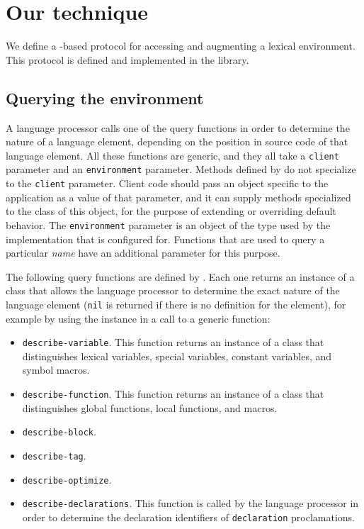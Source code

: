 \section{Our technique}
\label{sec-our-technique}

We define a \clos{}-based protocol for accessing and augmenting a
lexical environment.  This protocol is defined and implemented in the
\trucler{} library.

\subsection{Querying the environment}
\label{querying-the-environment}

A language processor calls one of the query functions in order to
determine the nature of a language element, depending on the position
in source code of that language element.  All these functions are
generic, and they all take a \texttt{client} parameter and an
\texttt{environment} parameter.  Methods defined by \trucler{} do not
specialize to the \texttt{client} parameter.  Client code should pass
an object specific to the application as a value of that parameter,
and it can supply methods specialized to the class of this object, for
the purpose of extending or overriding default behavior.  The
\texttt{environment} parameter is an object of the type used by the
implementation that \trucler{} is configured for.  Functions that are
used to query a particular \emph{name} have an additional parameter
for this purpose.

The following query functions are defined by \trucler{}.  Each one
returns an instance of a class that allows the language processor to
determine the exact nature of the language element (\texttt{nil} is
returned if there is no definition for the element), for example by
using the instance in a call to a generic function:

\begin{itemize}
\item \texttt{describe-variable}.  This function returns an instance
  of a class that distinguishes lexical variables, special variables,
  constant variables, and symbol macros.
\item \texttt{describe-function}.  This function returns an instance
  of a class that distinguishes global functions, local functions, and
  macros.
\item \texttt{describe-block}.
\item \texttt{describe-tag}.
\item \texttt{describe-optimize}.
\item \texttt{describe-declarations}.  This function is called by the
  language processor in order to determine the declaration identifiers
  of \texttt{declaration} proclamations.
\end{itemize}

